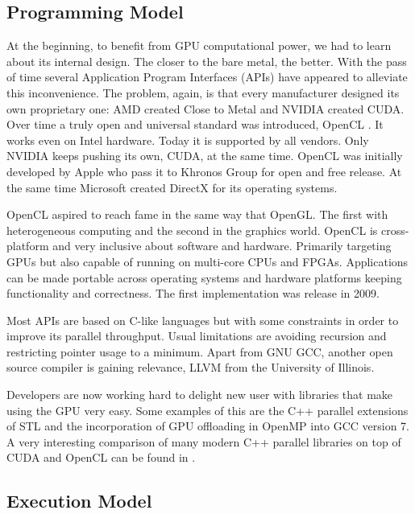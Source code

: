 \documentclass{article}
\begin{document}
\subsection{Programming Model}

At the beginning, to benefit from GPU computational power, we had to learn about its internal design. The closer to the bare metal, the better. With the pass of time several Application Program Interfaces (APIs) have appeared to alleviate this inconvenience. The problem, again, is that every manufacturer designed its own proprietary one: AMD created Close to Metal and NVIDIA created CUDA. Over time a truly open and universal standard was introduced, OpenCL \cite{opencl}. It works even on Intel hardware. Today it is supported by all vendors. Only NVIDIA keeps pushing its own, CUDA, at the same time. OpenCL was initially developed by Apple who pass it to Khronos Group for open and free release. At the same time Microsoft created DirectX for its operating systems.

OpenCL aspired to reach fame in the same way that OpenGL. The first with heterogeneous computing and the second in the graphics world. OpenCL is cross-platform and very inclusive about software and hardware. Primarily targeting GPUs but also capable of running on multi-core CPUs and FPGAs. Applications can be made portable across operating systems and hardware platforms keeping functionality and correctness. The first implementation was release in 2009.

Most APIs are based on C-like languages but with some constraints in order to improve its parallel throughput. Usual limitations are avoiding recursion and restricting pointer usage to a minimum. Apart from GNU GCC, another open source compiler is gaining relevance, LLVM \cite{LLVM} from the University of Illinois.

Developers are now working hard to delight new user with libraries that make using the GPU very easy. Some examples of this are the C++ parallel extensions of STL and the incorporation of GPU offloading in OpenMP into GCC version 7. A very interesting comparison of many modern C++ parallel libraries on top of CUDA and OpenCL can be found in \cite{doi:10.1137/120903683}.

\subsection{Execution Model}
\end{document}
